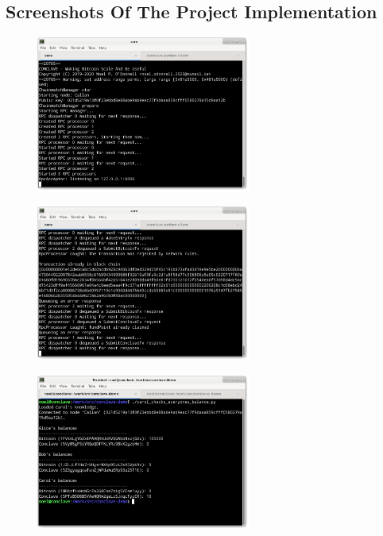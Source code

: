 \documentclass{report}
\begin{document}
\begin{appendices}
  \chapter{Screenshots Of The Project Implementation}
  		\begin{figure}[H]
		\centering
		\begin{minipage}{.5\textwidth}
		  \centering
		  \includegraphics[width=200pt]{img/screenshot-1.png}
		  \label{fig:test1}
		\end{minipage}%
		\begin{minipage}{.5\textwidth}
		  \centering
		  \includegraphics[width=200pt]{img/screenshot-2.png}
		  \label{fig:test2}
		\end{minipage}
		\break
		\begin{minipage}{.5\textwidth}
		  \centering
		  \includegraphics[width=200pt]{img/screenshot-3.png}

\end{minipage}
\end{figure}
\end{appendices}
\end{document}
